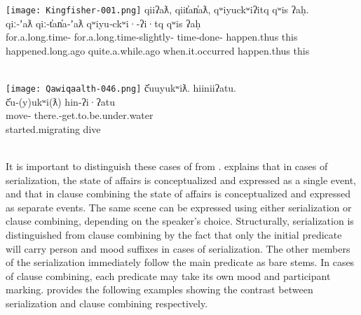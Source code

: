 \begin{exe}
  \ex\label{ex:3.11}
  \begin{xlist}

    \renewcommand{\eachwordfive}{\rule[-10pt]{0pt}{0pt}\rmfamily}

    \ex\label{ex:3.11a}
    \texttt{[image: Kingfisher-001.png]}
    \glllll qiiʔaƛ,                  qiit̓an̓aƛ,                         qʷiyuckʷiʔitq        qʷis        ʔaḥ.\\
            qiː‑ʼaƛ                  qiː‑t̓an̓a‑ʼaƛ                      qʷiyu‑ckʷi·‑ʔi·tq    qʷis        ʔaḥ\\
            for.a.long.time‑ for.a.long.time‑slightly‑ time‑done‑ happen.thus this\\
            happened.long.ago        quite.a.while.ago                 when.it.occurred     happen.thus this\\
                                                                     \\

    \clearpage

    \ex\label{ex:3.11b}
    \texttt{[image: Qawiqaalth-046.png]}
    \glllll č̓uuyukʷiƛ.        hiiniiʔatu.\\
            č̓u‑(y)ukʷi(ƛ)     hin‑ʔi·ʔatu\\
            move‑   there.‑get.to.be.under.water\\
            started.migrating dive\\
                     \\

    \renewcommand{\eachwordfive}{\rmfamily}

  \end{xlist}
\end{exe}

It is important to distinguish these cases of  from . \textcite[98]{Nakayama2001} explains that in cases of serialization, the state of affairs is conceptualized and expressed as a single event, and that in clause combining the state of affairs is conceptualized and expressed as separate events. The same scene can be expressed using either serialization or clause combining, depending on the speaker's choice. Structurally, serialization is distinguished from clause combining by the fact that only the initial predicate will carry person and mood suffixes in cases of serialization. The other members of the serialization immediately follow the main predicate as bare stems. In cases of clause combining, each predicate may take its own mood and participant marking. \textcite[99]{Nakayama2001} provides the following examples showing the contrast between serialization and clause combining respectively.

